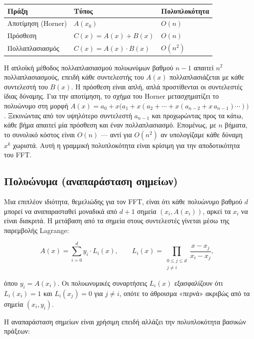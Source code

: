 \begin{longtable}[]{@{}lll@{}}
Πράξη & Τύπος & Πολυπλοκότητα \\
\endhead
\endlastfoot
Αποτίμηση (Horner) & \(A(x_0)\) & \(O(n)\) \\
Πρόσθεση & \(C(x) = A(x) + B(x)\) & \(O(n)\) \\
Πολλαπλασιασμός & \(C(x) = A(x) \cdot B(x)\) & \(O(n^2)\) \\
\end{longtable}

Η απλοϊκή μέθοδος πολλαπλασιασμού πολυωνύμων βαθμού \(n-1\) απαιτεί
\(n^2\) πολλαπλασιασμούς, επειδή κάθε συντελεστής του \(A(x)\)
πολλαπλασιάζεται με κάθε συντελεστή του \(B(x)\). Η πρόσθεση είναι απλή,
απλά προστίθενται οι συντελεστές ίδιας δύναμης. Για την αποτίμηση, το
σχήμα του Horner μετασχηματίζει το πολυώνυμο στη μορφή
\(A(x) = a_0 + x\bigl(a_1 + x(a_2 + \cdots + x(a_{n-2} + x\,a_{n-1})\cdots)\bigr)\).
Ξεκινώντας από τον υψηλότερο συντελεστή \(a_{n-1}\) και προχωρώντας προς
τα κάτω, κάθε βήμα απαιτεί μία πρόσθεση και έναν πολλαπλασιασμό.
Επομένως, με \(n\) βήματα, το συνολικό κόστος είναι \(O(n)\) --- αντί
για \(O(n^2)\) αν υπολογίζαμε κάθε δύναμη \(x^k\) χωριστά. Αυτή η
γραμμική πολυπλοκότητα είναι κρίσιμη για την αποδοτικότητα του FFT.

\subsection{Πολυώνυμα (αναπαράσταση
σημείων)}\label{ux3c0ux3bfux3bbux3c5ux3ceux3bdux3c5ux3bcux3b1-ux3b1ux3bdux3b1ux3c0ux3b1ux3c1ux3acux3c3ux3c4ux3b1ux3c3ux3b7-ux3c3ux3b7ux3bcux3b5ux3afux3c9ux3bd}

Μια επιπλέον ιδιότητα, θεμελιώδης για τον FFT, είναι ότι κάθε πολυώνυμο
βαθμού \(d\) μπορεί να αναπαρασταθεί μοναδικά από \(d+1\) σημεία
\((x_i, A(x_i))\), αρκεί τα \(x_i\) να είναι διακριτά. Η μετάβαση από τα
σημεία στους συντελεστές γίνεται μέσω της παρεμβολής Lagrange:

\[
A(x) = \sum_{i=0}^{d} y_i \cdot L_i(x), \qquad
L_i(x) = \prod_{\substack{0 \le j \le d \\ j \ne i}} \frac{x - x_j}{x_i - x_j},
\]

όπου \(y_i = A(x_i)\). Οι πολυωνυμικές συναρτήσεις \(L_i(x)\)
εξασφαλίζουν ότι \(L_i(x_i)=1\) και \(L_i(x_j)=0\) για \(j \ne i\),
οπότε το άθροισμα «περνά» ακριβώς από τα σημεία \((x_i, y_i)\).

Η αναπαράσταση σημείων είναι χρήσιμη επειδή αλλάζει την πολυπλοκότητα
βασικών πράξεων:


